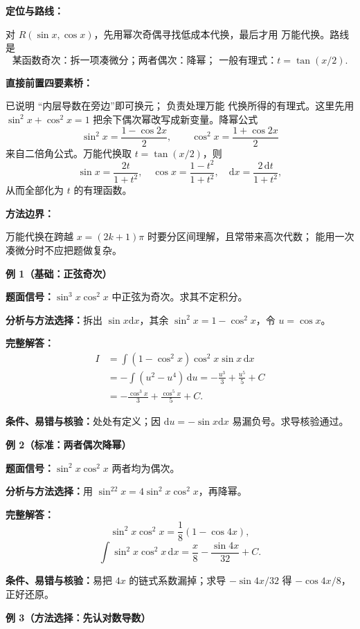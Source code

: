\begin{knowledgeBox}
\textbf{定位与路线：}

对 \(R(\sin x,\cos x)\)，先用幂次奇偶寻找低成本代换，最后才用
万能代换。路线是
\[
\boxed{\text{某函数奇次：拆一项凑微分；两者偶次：降幂；
一般有理式：}t=\tan(x/2).}
\]

\textbf{直接前置四要素桥：}

已说明
“内层导数在旁边”即可换元；
负责处理万能
代换所得的有理式。这里先用
\(\sin^2x+\cos^2x=1\) 把余下偶次幂改写成新变量。降幂公式
\[
\sin^2x=\frac{1-\cos2x}{2},\qquad
\cos^2x=\frac{1+\cos2x}{2}
\]
来自二倍角公式。万能代换取 \(t=\tan(x/2)\)，则
\[
\sin x=\frac{2t}{1+t^2},\quad
\cos x=\frac{1-t^2}{1+t^2},\quad
\mathrm dx=\frac{2\,\mathrm dt}{1+t^2},
\]
从而全部化为 \(t\) 的有理函数。

\textbf{方法边界：}

万能代换在跨越 \(x=(2k+1)\pi\) 时要分区间理解，且常带来高次代数；
能用一次凑微分时不应把题做复杂。

\textbf{例 1（基础：正弦奇次）}

\textbf{题面信号：}\(\sin^3x\cos^2x\) 中正弦为奇次。求其不定积分。

\textbf{分析与方法选择：}拆出 \(\sin x\mathrm dx\)，其余
\(\sin^2x=1-\cos^2x\)，令 \(u=\cos x\)。

\textbf{完整解答：}
\[
\begin{aligned}
I&=\int(1-\cos^2x)\cos^2x\sin x\,\mathrm dx\\
&=-\int(u^2-u^4)\,\mathrm du
=-\frac{u^3}{3}+\frac{u^5}{5}+C\\
&=-\frac{\cos^3x}{3}+\frac{\cos^5x}{5}+C.
\end{aligned}
\]

\textbf{条件、易错与核验：}处处有定义；因
\(\mathrm du=-\sin x\mathrm dx\) 易漏负号。求导核验通过。

\textbf{例 2（标准：两者偶次降幂）}

\textbf{题面信号：}\(\sin^2x\cos^2x\) 两者均为偶次。

\textbf{分析与方法选择：}用
\(\sin^22x=4\sin^2x\cos^2x\)，再降幂。

\textbf{完整解答：}
\[
\sin^2x\cos^2x=\frac18(1-\cos4x),
\]
\[
\int\sin^2x\cos^2x\,\mathrm dx
=\frac x8-\frac{\sin4x}{32}+C.
\]

\textbf{条件、易错与核验：}易把 \(4x\) 的链式系数漏掉；求导
\(-\sin4x/32\) 得 \(-\cos4x/8\)，正好还原。

\textbf{例 3（方法选择：先认对数导数）}


\end{knowledgeBox}
